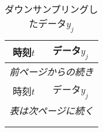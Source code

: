 \begin{longtable}[c]{cc}
  \caption{ダウンサンプリングしたデータ$y_j$}
  \label{tab:yj}
  \\

  \hline
  時刻$t$&データ$y_j$\\
  \hline \hline
  \endfirsthead

  \multicolumn{2}{l}{\small\it 前ページからの続き}\\
  \hline
  時刻$t$&データ$y_j$\\
  \hline\hline
  \endhead

  \hline
  \multicolumn{2}{r}{\small\it 表は次ページに続く}\\
  \endfoot

  \hline
  \multicolumn{2}{r}{\small\it これで終わり}\\
  \endlastfoot


\end{longtable}
